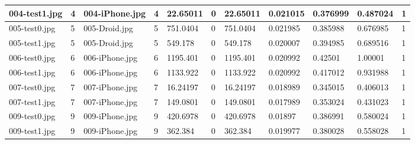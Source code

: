 \begin{landscape}
\begin{longtable}{|p{2cm}|p{1cm}|p{2cm}|p{1cm}|p{2cm}|p{1cm}|p{2cm}|p{2cm}|p{2cm}|p{2cm}|p{1cm}|}
	004-test1.jpg   & 4                & 004-iPhone.jpg        & 4                           & 22.65011              & 0                       & 22.65011                   & 0.021015              & 0.376999              & 0.487024                 & 1                \\ \hline
	005-test0.jpg   & 5                & 005-Droid.jpg         & 5                           & 751.0404              & 0                       & 751.0404                   & 0.021985              & 0.385988              & 0.676985                 & 1                \\ \hline
	005-test1.jpg   & 5                & 005-Droid.jpg         & 5                           & 549.178               & 0                       & 549.178                    & 0.020007              & 0.394985              & 0.689516                 & 1                \\ \hline
	006-test0.jpg   & 6                & 006-iPhone.jpg        & 6                           & 1195.401              & 0                       & 1195.401                   & 0.020992              & 0.42501               & 1.00001                  & 1                \\ \hline
	006-test1.jpg   & 6                & 006-iPhone.jpg        & 6                           & 1133.922              & 0                       & 1133.922                   & 0.020992              & 0.417012              & 0.931988                 & 1                \\ \hline
	007-test0.jpg   & 7                & 007-iPhone.jpg        & 7                           & 16.24197              & 0                       & 16.24197                   & 0.018989              & 0.345015              & 0.406013                 & 1                \\ \hline
	007-test1.jpg   & 7                & 007-iPhone.jpg        & 7                           & 149.0801              & 0                       & 149.0801                   & 0.017989              & 0.353024              & 0.431023                 & 1                \\ \hline
	009-test0.jpg   & 9                & 009-iPhone.jpg        & 9                           & 420.6978              & 0                       & 420.6978                   & 0.01897               & 0.386991              & 0.580024                 & 1                \\ \hline
	009-test1.jpg   & 9                & 009-iPhone.jpg        & 9                           & 362.384               & 0                       & 362.384                    & 0.019977              & 0.380028              & 0.558028                 & 1                \\ \hline

\end{longtable}
\end{landscape}

